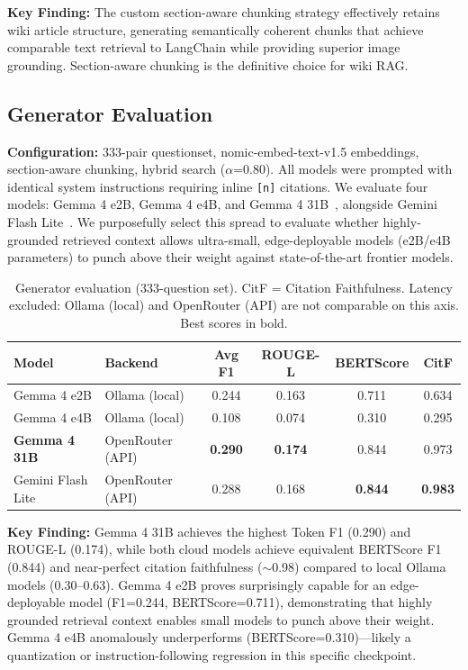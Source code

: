 \documentclass[11pt,a4paper]{article}
\begin{document}
\textbf{Key Finding:} The custom section-aware chunking strategy effectively retains wiki article structure, generating semantically coherent chunks that achieve comparable text retrieval to LangChain while providing superior image grounding. Section-aware chunking is the definitive choice for wiki RAG.

\subsection{Generator Evaluation}

\textbf{Configuration:} 333-pair questionset, nomic-embed-text-v1.5 embeddings, section-aware chunking, hybrid search ($\alpha$=0.80). All models were prompted with identical system instructions requiring inline \texttt{[n]} citations. We evaluate four models: Gemma 4 e2B, Gemma 4 e4B, and Gemma 4 31B~\cite{gemma2024}, alongside Gemini Flash Lite~\cite{gemini2023}. We purposefully select this spread to evaluate whether highly-grounded retrieved context allows ultra-small, edge-deployable models (e2B/e4B parameters) to punch above their weight against state-of-the-art frontier models.

\begin{table}[h]
\caption{Generator evaluation (333-question set). CitF = Citation Faithfulness. Latency excluded: Ollama (local) and OpenRouter (API) are not comparable on this axis. Best scores in bold.}
\label{tab:generator}
\centering
\begin{tabular}{llcccc}
\toprule
\textbf{Model} & \textbf{Backend} & \textbf{Avg F1} & \textbf{ROUGE-L} & \textbf{BERTScore} & \textbf{CitF} \\
\midrule
Gemma 4 e2B & Ollama (local)      & 0.244 & 0.163 & 0.711 & 0.634 \\
Gemma 4 e4B & Ollama (local)      & 0.108 & 0.074 & 0.310 & 0.295 \\
\textbf{Gemma 4 31B}   & OpenRouter (API)    & \textbf{0.290} & \textbf{0.174} & 0.844 & 0.973 \\
Gemini Flash Lite & OpenRouter (API) & 0.288 & 0.168 & \textbf{0.844} & \textbf{0.983} \\
\bottomrule
\end{tabular}

\end{table}

\textbf{Key Finding:} Gemma 4 31B achieves the highest Token F1 (0.290) and ROUGE-L (0.174), while both cloud models achieve equivalent BERTScore F1 (0.844) and near-perfect citation faithfulness ($\sim$0.98) compared to local Ollama models (0.30--0.63). Gemma 4 e2B proves surprisingly capable for an edge-deployable model (F1=0.244, BERTScore=0.711), demonstrating that highly grounded retrieval context enables small models to punch above their weight. Gemma 4 e4B anomalously underperforms (BERTScore=0.310)---likely a quantization or instruction-following regression in this specific checkpoint.
\end{document}
